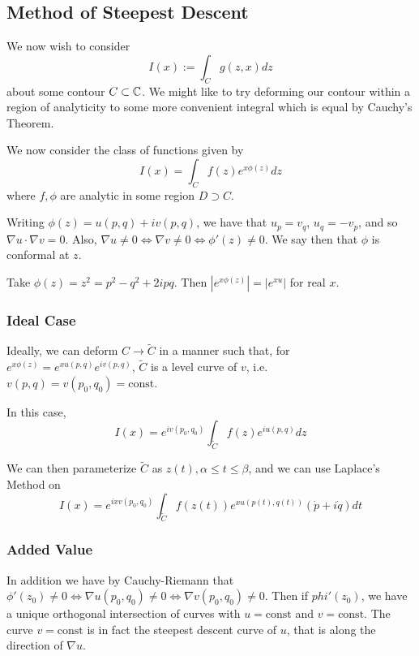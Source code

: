 \documentclass[a4paper]{article}
\begin{document}
\subsection{Method of Steepest Descent}

We now wish to consider 
\[
	I(x) := \int_{C} g(z, x) dz
\] about some contour $C \subset \mathbb{C}$. We might like to try deforming our contour within a region of analyticity to some more convenient integral which is equal by Cauchy's Theorem.

We now consider the class of functions given by
\[
	I(x) = \int_{C} f(z) e^{x\phi(z)} dz
\] where $f, \phi$ are analytic in some region $D \supset C$.

Writing $\phi(z) = u(p, q) + iv(p,q)$, we have that $u_p = v_q$, $u_q = -v_p$, and so $\nabla u \cdot  \nabla v = 0$. Also, $\nabla u \neq  0 \iff \nabla v \neq 0 \iff \phi'(z) \neq 0$. We say then that $\phi$ is conformal at $z$.

\begin{eg}
	Take $\phi(z) = z^2 = p^2-q^2 + 2ipq$. Then $|e^{x\phi(z)}| = |e^{xu}|$ for real $x$.
\end{eg}

\subsubsection*{Ideal Case}

Ideally, we can deform $C \to \tilde{C}$ in a manner such that, for $e^{x\phi(z)} = e^{xu(p,q)} e^{iv(p,q)}$, $\tilde{C}$ is a level curve of $v$, i.e. $v(p,q) = v(p_0, q_0) = \text{const}$. 

In this case, \[
	I(x) = e^{iv(p_0,q_0)}\int_{\tilde{C}} f(z) e^{iu(p,q)} dz
\]

We can then parameterize $\tilde{C}$ as $z(t), \alpha \le t \le \beta$, and we can use Laplace's Method on 
\[
	I(x) = e^{ixv(p_0, q_0)} \int_{\tilde{C}} f(z(t)) e^{xu(p(t), q(t))} (\dot{p} + i \dot{q})dt
\]

\subsubsection*{Added Value}

In addition we have by Cauchy-Riemann that $\phi'(z_0) \neq 0 \iff \nabla u(p_0, q_0) \neq 0 \iff \nabla v(p_0, q_0) \neq 0$. Then if $phi'(z_0)$, we have a unique orthogonal intersection of curves with $u=\text{const}$ and $v = \text{const}$. The curve $v = \text{const}$ is in fact the steepest descent curve of $u$, that is along the direction of $\nabla u$.
\end{document}
